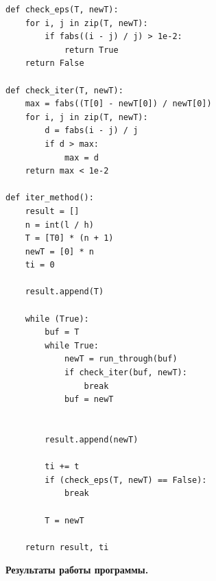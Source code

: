 \documentclass[a4paper,14pt]{extreport} %
\begin{document}
\begin{lstlisting}[caption=Метод простых итераций]
def check_eps(T, newT):
    for i, j in zip(T, newT):
        if fabs((i - j) / j) > 1e-2:
            return True
    return False

def check_iter(T, newT):
    max = fabs((T[0] - newT[0]) / newT[0])
    for i, j in zip(T, newT):
        d = fabs(i - j) / j
        if d > max:
            max = d
    return max < 1e-2

def iter_method():
    result = []
    n = int(l / h)
    T = [T0] * (n + 1)
    newT = [0] * n
    ti = 0

    result.append(T)

    while (True):
        buf = T
        while True:
            newT = run_through(buf)
            if check_iter(buf, newT):
                break
            buf = newT


        result.append(newT)

        ti += t
        if (check_eps(T, newT) == False):
            break

        T = newT

    return result, ti
\end{lstlisting}
\newpage 
\textbf{Результаты работы программы. }
\end{document}
